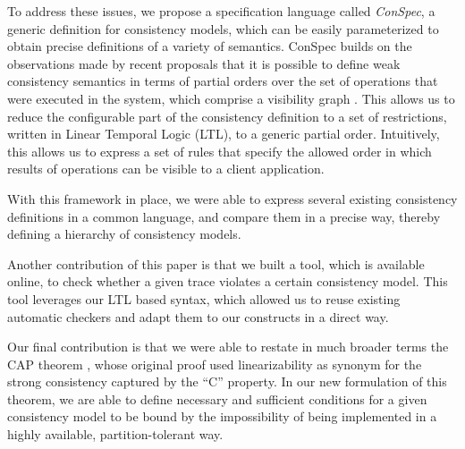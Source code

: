 \documentclass[acmlarge, ,11pt]{acmart}
\begin{document}
To address these issues, we propose a specification language called
\emph{ConSpec}, a generic definition for consistency models, which can
be easily parameterized to obtain precise definitions of a variety of
semantics. ConSpec builds on the observations made by recent proposals
that it is possible to define weak consistency semantics in terms of
partial orders over the set of operations that were executed in the
system, which comprise a visibility graph
\cite{Li:2012:MGS:2387880.2387906, Gotsman:2016:CIS:2837614.2837625, cheng-papoc}. This allows us to reduce
the configurable part of the consistency definition to a set of restrictions,
written in Linear Temporal Logic (LTL), to a generic partial order.
Intuitively, this allows us to express a set of rules that specify the allowed order in which results of operations can be visible to a client application.


With this framework in place, we were able to express several existing
consistency definitions in a common language, and compare them in a precise
way, thereby defining a hierarchy of consistency models. %

Another contribution of this paper is that we built a tool, which is available online, to check whether a given trace violates a certain consistency model. This tool leverages our LTL based syntax, which allowed us to reuse existing automatic checkers and adapt them to our constructs in a direct way.

Our final contribution is that we were able to restate in much broader terms the CAP theorem \cite{brew:cap, Gilbert:2002:BCF:564585.564601}, whose original proof used linearizability as synonym for the strong consistency captured by the ``C'' property. In our new formulation of this theorem, we are able to define necessary and sufficient conditions for a given consistency model to be bound by the impossibility of being implemented in a highly available, partition-tolerant way.
\end{document}

